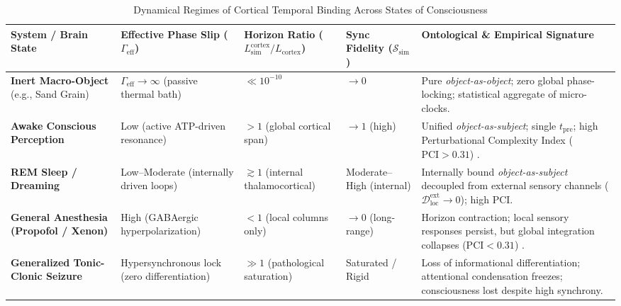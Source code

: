 \documentclass[11pt,a4paper]{article}
\begin{document}
\begin{table}[htbp]
\centering
\caption{Dynamical Regimes of Cortical Temporal Binding Across States of Consciousness}
\label{tab:states}
\small
\begin{tabularx}{\textwidth}{@{}p{2.9cm}p{2.3cm}p{2.4cm}p{2.4cm}X@{}}
\toprule
\textbf{System / Brain State} & \textbf{Effective Phase Slip ($\Gamma_{\mathrm{eff}}$)} & \textbf{Horizon Ratio ($L_{\mathrm{sim}}^{\mathrm{cortex}} / L_{\mathrm{cortex}}$)} & \textbf{Sync Fidelity ($\mathcal{S}_{\mathrm{sim}}$)} & \textbf{Ontological \& Empirical Signature} \\
\midrule
\textbf{Inert Macro-Object} (e.g., Sand Grain) & $\Gamma_{\mathrm{eff}} \to \infty$ (passive thermal bath) & $\ll 10^{-10}$ & $\to 0$ & Pure \emph{object-as-object}; zero global phase-locking; statistical aggregate of micro-clocks. \\
\addlinespace
\textbf{Awake Conscious Perception} & Low (active ATP-driven resonance) & $> 1$ (global cortical span) & $\to 1$ (high) & Unified \emph{object-as-subject}; single $t_{\mathrm{pre}}$; high Perturbational Complexity Index ($\mathrm{PCI} > 0.31$) \cite{casali2013}. \\
\addlinespace
\textbf{REM Sleep / Dreaming} & Low–Moderate (internally driven loops) & $\gtrsim 1$ (internal thalamocortical) & Moderate–High (internal) & Internally bound \emph{object-as-subject} decoupled from external sensory channels ($\mathcal{D}_{\mathrm{loc}}^{\mathrm{ext}} \to 0$); high PCI. \\
\addlinespace
\textbf{General Anesthesia (Propofol / Xenon)} & High (GABAergic hyperpolarization) & $< 1$ (local columns only) & $\to 0$ (long-range) & Horizon contraction; local sensory responses persist, but global integration collapses ($\mathrm{PCI} < 0.31$) \cite{mashour2020}. \\
\addlinespace
\textbf{Generalized Tonic-Clonic Seizure} & Hypersynchronous lock (zero differentiation) & $\gg 1$ (pathological saturation) & Saturated / Rigid & Loss of informational differentiation; attentional condensation freezes; consciousness lost despite high synchrony. \\
\bottomrule
\end{tabularx}
\end{table}
\end{document}
